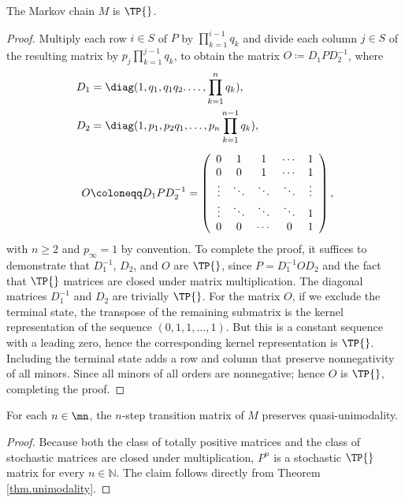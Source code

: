 \documentclass[11pt]{article}
\begin{document}
	
	\begin{thm}\label{prop:tp.stochastic.operator}
		The Markov chain $M$  is $\TP{}$.
	\end{thm}
	\begin{proof}
		Multiply each row $i\in S$ of  $P$ by $\prod_{k=1}^{i-1}q_{k}$ and divide  each column   $j \in S$ of the resulting matrix by $ p_j\prod_{k = 1}^{j-1} q_k $, to obtain the matrix $O \coloneqq D_1PD_2^{-1}$, where
		\begin{equation}\label{def.ABC}
			\begin{aligned}
				D_1 &= \diag(1, q_1, q_1q_2. \ldots, \prod_{k=1}^{n}q_{k}),\\
				D_2 &= \diag(1, p_1,  p_2q_1, \ldots,  p_{n}\prod_{k=1}^{n-1}q_{k}),\\[5pt]
				O&\coloneqq D_1PD_2^{-1} = \left(\begin{array}{cccccc}
					0 & 1 & 1 & \cdots& 1\\
					0 & 0 & 1 &   \cdots & 1\\
					\vdots & \ddots  &\ddots &\ddots & \vdots\\
					\vdots & \ddots  &\ddots &\ddots & 1\\		
					0 & 0 & \cdots  &0 &1 \\				
				\end{array}\right),
		\end{aligned}
	\end{equation}
	with $n \ge 2$ and $p_\infty = 1$ by convention. To complete the proof, it suffices to demonstrate that \( D_1^{-1} \), \( D_2 \), and \( O \) are \( \TP{} \), since \( P = D_1^{-1} O D_2 \) and the fact that \( \TP{} \) matrices are closed under matrix multiplication. The diagonal matrices \( D_1^{-1} \) and \( D_2 \) are trivially \( \TP{} \). For the matrix $O$, if we exclude the terminal state, the transpose of the remaining submatrix is the kernel representation of the sequence \( (0,1,1,\dots,1)\).  But this  is a constant sequence with a leading zero, hence the corresponding  kernel representation is  \( \TP{} \). Including the terminal state adds a row and column that preserve nonnegativity of all minors. Since all minors of all orders are nonnegative; hence   \( O \) is \( \TP{} \), completing the proof.

\end{proof}

\begin{lemma}\label{lemma.nth.transition.quasi}
	For each $n \in \mn$, the $n$-step transition matrix of $M$ preserves quasi-unimodality.
\end{lemma}
\begin{proof}
	Because both the class of totally positive matrices and the class of stochastic matrices are closed under multiplication,  \( P^n \) is a stochastic \( \TP{} \) matrix  for every \( n \in \mathbb{N} \). The claim follows directly from Theorem \ref{thm.unimodality}.
\end{proof}	
\end{document}
